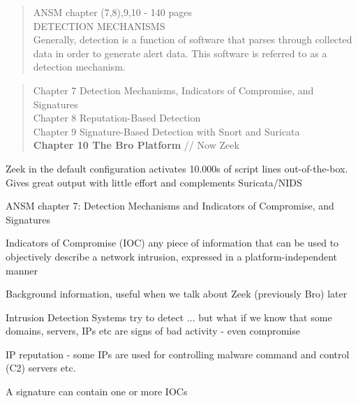 \documentclass[Screen16to9,17pt]{foils}
\begin{document}

\begin{quote}
ANSM chapter (7,8),9,10 - 140 pages\\
DETECTION MECHANISMS\\
Generally, detection is a function of software that parses through collected data in order to generate alert data. This software is referred to as a detection mechanism.
\end{quote}

\begin{quote}
Chapter 7 Detection Mechanisms, Indicators of Compromise, and Signatures\\
Chapter 8 Reputation-Based Detection\\
Chapter 9 Signature-Based Detection with Snort and Suricata\\{\bf
Chapter 10 The Bro Platform} // Now Zeek
\end{quote}

Zeek in the default configuration activates 10.000s of script lines out-of-the-box.\\
Gives great output with little effort and complements Suricata/NIDS





\begin{list1}
\item ANSM chapter 7: Detection Mechanisms and Indicators of Compromise, and Signatures

\begin{list2}
\item Indicators of Compromise (IOC) any piece of information that can be used to objectively describe a
network intrusion, expressed in a platform-independent manner
\item Background information, useful when we talk about Zeek (previously Bro) later
\item Intrusion Detection Systems try to detect ... but what if we know that some domains, servers, IPs etc are signs of bad activity - even compromise
\item IP reputation - some IPs are used for controlling malware command and control (C2) servers etc.
\item A signature can contain one or more IOCs
\end{list2}
\end{list1}
\end{document}
